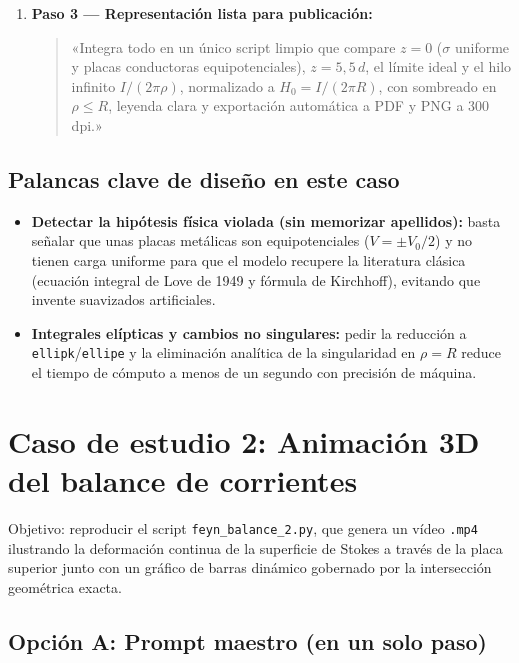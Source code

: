 \documentclass[11pt]{article}
\begin{document}
\begin{enumerate}
    \item \textbf{Paso 3 --- Representación lista para publicación:}
    \begin{quote}
    «Integra todo en un único script limpio que compare $z = 0$ ($\sigma$ uniforme y placas conductoras equipotenciales), $z = 5{,}5\,d$, el límite ideal y el hilo infinito $I/(2\pi\rho)$, normalizado a $H_0 = I/(2\pi R)$, con sombreado en $\rho \le R$, leyenda clara y exportación automática a PDF y PNG a 300 dpi.»
    \end{quote}
\end{enumerate}

\subsection{Palancas clave de diseño en este caso}

\begin{itemize}
    \item \textbf{Detectar la hipótesis física violada (sin memorizar apellidos):} basta señalar que unas placas metálicas son equipotenciales ($V = \pm V_0/2$) y no tienen carga uniforme para que el modelo recupere la literatura clásica (ecuación integral de Love de 1949 y fórmula de Kirchhoff), evitando que invente suavizados artificiales.
    \item \textbf{Integrales elípticas y cambios no singulares:} pedir la reducción a \texttt{ellipk}/\texttt{ellipe} y la eliminación analítica de la singularidad en $\rho = R$ reduce el tiempo de cómputo a menos de un segundo con precisión de máquina.
\end{itemize}

\section{Caso de estudio 2: Animación 3D del balance de corrientes}

Objetivo: reproducir el script \texttt{feyn\_balance\_2.py}, que genera un vídeo \texttt{.mp4} ilustrando la deformación continua de la superficie de Stokes a través de la placa superior junto con un gráfico de barras dinámico gobernado por la intersección geométrica exacta.

\subsection{Opción A: Prompt maestro (en un solo paso)}
\end{document}
